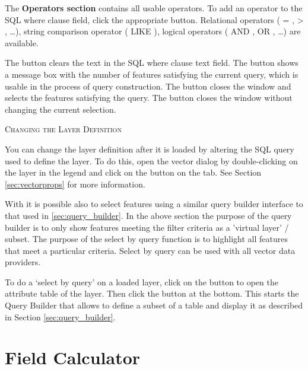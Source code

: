 The \textbf{Operators section} contains all usable operators. To add an operator 
to the SQL where clause field, click the appropriate button. Relational operators 
( = , > , \dots), string comparison operator ( LIKE ), logical operators ( AND , OR 
, \dots) are available. 

The  button clears the text in the SQL where clause text field. The 
 button shows a message box with the number of features satisfying 
the current query, which is usable in the process of query construction. The 
 button closes the window and selects the features satisfying the 
query. The  button closes the window without changing the current 
selection. 

\begin{Tip}\caption{\textsc{Changing the Layer Definition}}
You can change the layer definition after it is loaded by altering
the SQL query used to define the layer. To do this, open the 
vector  dialog by double-clicking on the layer in the legend and click on the
 button on the  tab. See Section
\ref{sec:vectorprops} for more information.
\end{Tip}

\label{sec:select_by_query}

With \qg it is possible also to select features using a similar query builder 
interface to that used in \ref{sec:query_builder}. In the above section 
the purpose of the query builder is to only show features meeting the 
filter criteria as a 'virtual layer' / subset. The purpose of the select by 
query function is to highlight all features that meet a particular criteria. 
Select by query can be used with all vector data providers.

To do a `select by query' on a loaded layer, click on the 
button  to open the attribute table of the layer. Then 
click the  button at the bottom. This starts the Query Builder 
that allows to define a subset of a table and display it as described in Section 
\ref{sec:query_builder}.

\section{Field Calculator}\label{sec:field_calculator}

